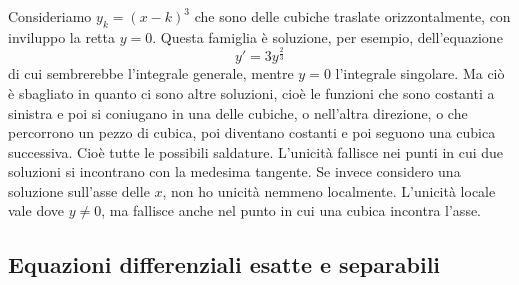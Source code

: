 \documentclass[a4paper]{article}
\begin{document}
\begin{radioactive}
\begin{snippetexample}{}
    \begin{figure}
        \begin{center}
        \end{center}
    \end{figure}
    Consideriamo \(y_k = (x-k)^3\) che sono delle cubiche traslate orizzontalmente,
    con inviluppo la retta \(y=0\).
    Questa famiglia è soluzione, per esempio, dell'equazione
    \[
        y' = 3y^{\frac23}
    \]
    di cui sembrerebbe l'integrale generale, mentre \(y=0\) l'integrale singolare.
    Ma ciò è sbagliato in quanto ci sono altre soluzioni,
    cioè le funzioni che sono costanti a sinistra e poi si coniugano in una delle cubiche,
    o nell'altra direzione, o che percorrono un pezzo di cubica, poi diventano costanti e poi seguono una cubica successiva.
    Cioè tutte le possibili saldature.
    L'unicità fallisce nei punti in cui due soluzioni si incontrano con la medesima tangente. Se invece considero una soluzione sull'asse delle \(x\),
    non ho unicità nemmeno localmente. L'unicità locale vale dove \(y\neq0\),
    ma fallisce anche nel punto in cui una cubica incontra l'asse.
    \wrapfill
\end{snippetexample}
\end{radioactive}

\subsection{Equazioni differenziali esatte e separabili}
\end{document}
